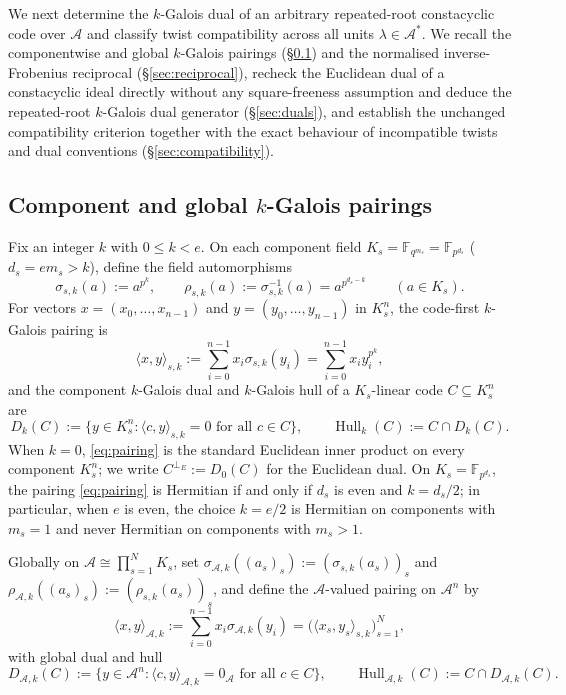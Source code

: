 \documentclass[preprint,12pt]{elsarticle}
\newcommand{\F}{\mathbb F}
\newcommand{\A}{\mathcal A}
\newcommand{\Hull}{\operatorname{Hull}}
\newcommand{\perpE}{\perp_E}
\newcommand{\Dk}{D_k}
\numberwithin{equation}{section}
\theoremstyle{plain}
\theoremstyle{definition}
\theoremstyle{remark}
\begin{document}
We next determine the $k$-Galois dual of an arbitrary repeated-root constacyclic
code over $\A$ and classify twist compatibility across all units $\lambda\in\A^*$.
We recall the componentwise and global $k$-Galois pairings (\S\ref{sec:pairing})
and the normalised inverse-Frobenius reciprocal (\S\ref{sec:reciprocal}), recheck
the Euclidean dual of a constacyclic ideal directly without any square-freeness
assumption and deduce the repeated-root $k$-Galois dual generator
(\S\ref{sec:duals}), and establish the unchanged compatibility criterion together
with the exact behaviour of incompatible twists and dual conventions
(\S\ref{sec:compatibility}).

\subsection{Component and global \texorpdfstring{$k$}{k}-Galois pairings}\label{sec:pairing}

Fix an integer $k$ with $0\le k<e$. On each component field
$K_s=\F_{q^{m_s}}=\F_{p^{d_s}}$ ($d_s=em_s>k$), define the field automorphisms
\begin{equation}\label{eq:frobenius}
\sigma_{s,k}(a):=a^{p^k},
\qquad
\rho_{s,k}(a):=\sigma_{s,k}^{-1}(a)=a^{p^{d_s-k}}
\qquad(a\in K_s).
\end{equation}
For vectors $x=(x_0,\dots,x_{n-1})$ and $y=(y_0,\dots,y_{n-1})$ in $K_s^n$, the
code-first $k$-Galois pairing \cite{fanZhang2017} is
\begin{equation}\label{eq:pairing}
\langle x,y\rangle_{s,k}:=\sum_{i=0}^{n-1}x_i\sigma_{s,k}(y_i)
 =\sum_{i=0}^{n-1}x_i y_i^{p^k},
\end{equation}
and the component $k$-Galois dual and $k$-Galois hull of a $K_s$-linear code
$C\subseteq K_s^n$ are
\[
\Dk(C):=\{y\in K_s^n:\langle c,y\rangle_{s,k}=0\text{ for all }c\in C\},
\qquad
\Hull_k(C):=C\cap\Dk(C).
\]
When $k=0$, \eqref{eq:pairing} is the standard Euclidean inner product on every
component $K_s^n$; we write $C^{\perpE}:=D_0(C)$ for the Euclidean dual. On
$K_s=\F_{p^{d_s}}$, the pairing \eqref{eq:pairing} is Hermitian if and only if
$d_s$ is even and $k=d_s/2$; in particular, when $e$ is even, the choice $k=e/2$
is Hermitian on components with $m_s=1$ and never Hermitian on components with
$m_s>1$.

Globally on $\A\cong\prod_{s=1}^{N}K_s$, set
$\sigma_{\A,k}((a_s)_s):=(\sigma_{s,k}(a_s))_s$ and
$\rho_{\A,k}((a_s)_s):=(\rho_{s,k}(a_s))_s$, and define the $\A$-valued pairing
on $\A^n$ by
\begin{equation}\label{eq:global-pairing}
\langle x,y\rangle_{\A,k}:=\sum_{i=0}^{n-1}x_i\sigma_{\A,k}(y_i)
 =\bigl(\langle x_s,y_s\rangle_{s,k}\bigr)_{s=1}^{N},
\end{equation}
with global dual and hull
\[
D_{\A,k}(C):=\{y\in\A^n:\langle c,y\rangle_{\A,k}=0_\A\text{ for all }c\in C\},
\qquad
\Hull_{\A,k}(C):=C\cap D_{\A,k}(C).
\]
\end{document}
